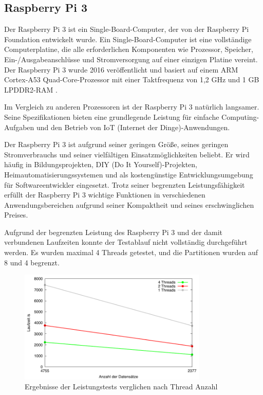 \subsection{Raspberry Pi 3}
Der Raspberry Pi 3 ist ein Single-Board-Computer, der von der Raspberry Pi Foundation entwickelt wurde. Ein Single-Board-Computer ist eine vollständige Computerplatine, die alle erforderlichen Komponenten wie Prozessor, Speicher, Ein-/Ausgabeanschlüsse und Stromversorgung auf einer einzigen Platine vereint. Der Raspberry Pi 3 wurde 2016 veröffentlicht und basiert auf einem ARM Cortex-A53 Quad-Core-Prozessor mit einer Taktfrequenz von 1,2 GHz und 1 GB LPDDR2-RAM \citep{RaspberryPi_Technische_Daten}.

Im Vergleich zu anderen Prozessoren ist der Raspberry Pi 3 natürlich langsamer. Seine Spezifikationen bieten eine grundlegende Leistung für einfache Computing-Aufgaben und den Betrieb von IoT (Internet der Dinge)-Anwendungen.

Der Raspberry Pi 3 ist aufgrund seiner geringen Größe, seines geringen Stromverbrauchs und seiner vielfältigen Einsatzmöglichkeiten beliebt. Er wird häufig in Bildungsprojekten, DIY (Do It Yourself)-Projekten, Heimautomatisierungssystemen und als kostengünstige Entwicklungsumgebung für Softwareentwickler eingesetzt. Trotz seiner begrenzten Leistungsfähigkeit erfüllt der Raspberry Pi 3 wichtige Funktionen in verschiedenen Anwendungsbereichen aufgrund seiner Kompaktheit und seines erschwinglichen Preises.

Aufgrund der begrenzten Leistung des Raspberry Pi 3 und der damit verbundenen Laufzeiten konnte der Testablauf nicht vollständig durchgeführt werden. Es wurden maximal 4 Threads getestet, und die Partitionen wurden auf 8 und 4 begrenzt.

\begin{figure}[H]
\centering
\includegraphics[width=0.8\textwidth]{../results/plots/raspberrypi3/comp_all_threads.pdf}
\caption{Ergebnisse der Leistungstests verglichen nach Thread Anzahl}
\label{fig:raspi_benchmark_threads}
\end{figure}

